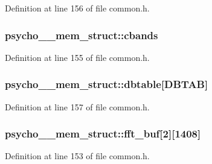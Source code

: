 Definition at line 156 of file common.\+h.

\subsubsection[{\texorpdfstring{cbands}{cbands}}]{ psycho\+\_\+\_\+mem\+\_\+struct\+::cbands}\hypertarget{structpsycho__3__mem__struct_aa44c1cab5f4660e0fe6398bfb27cb51b}{}\label{structpsycho__3__mem__struct_aa44c1cab5f4660e0fe6398bfb27cb51b}


Definition at line 155 of file common.\+h.

\subsubsection[{\texorpdfstring{dbtable}{dbtable}}]{ psycho\+\_\+\_\+mem\+\_\+struct\+::dbtable\mbox{[}{\bf D\+B\+T\+AB}\mbox{]}}\hypertarget{structpsycho__3__mem__struct_a757825cf5dc16a8e8ce473fbf0081968}{}\label{structpsycho__3__mem__struct_a757825cf5dc16a8e8ce473fbf0081968}


Definition at line 157 of file common.\+h.

\subsubsection[{\texorpdfstring{fft\+\_\+buf}{fft_buf}}]{ psycho\+\_\+\_\+mem\+\_\+struct\+::fft\+\_\+buf\mbox{[}2\mbox{]}\mbox{[}1408\mbox{]}}\hypertarget{structpsycho__3__mem__struct_a2371122a5a27f5f02b3e86701d4e43f9}{}\label{structpsycho__3__mem__struct_a2371122a5a27f5f02b3e86701d4e43f9}


Definition at line 153 of file common.\+h.

